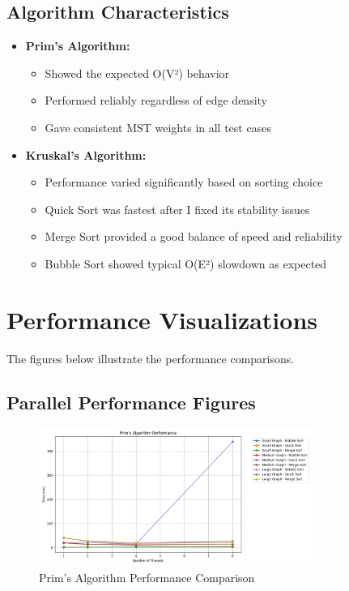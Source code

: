 \documentclass[11pt]{article}
\begin{document}
\subsection{Algorithm Characteristics}
\begin{itemize}
    \item \textbf{Prim's Algorithm:}
    \begin{itemize}
        \item Showed the expected O(V²) behavior
        \item Performed reliably regardless of edge density
        \item Gave consistent MST weights in all test cases
    \end{itemize}
    
    \item \textbf{Kruskal's Algorithm:}
    \begin{itemize}
        \item Performance varied significantly based on sorting choice
        \item Quick Sort was fastest after I fixed its stability issues
        \item Merge Sort provided a good balance of speed and reliability
        \item Bubble Sort showed typical O(E²) slowdown as expected
    \end{itemize}
\end{itemize}

\section{Performance Visualizations}
The figures below illustrate the performance comparisons.

\subsection{Parallel Performance Figures}
\begin{figure}[H]
    \centering
    \includegraphics[width=0.8\textwidth]{prims_comparison}
    \caption{Prim's Algorithm Performance Comparison}
    \label{fig:prims_comparison}
\end{figure}
\end{document}
